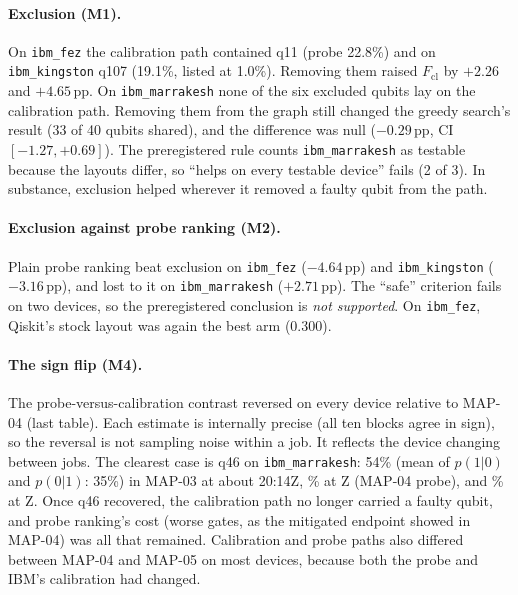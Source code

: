 \documentclass[10pt,twocolumn]{article}
\begin{document}
\paragraph{Exclusion (M1).} On \texttt{ibm\_fez} the calibration path contained q11 (probe 22.8\%) and on
\texttt{ibm\_kingston} q107 (19.1\%, listed at 1.0\%). Removing them raised $F_{\mathrm{cl}}$ by
$+2.26$ and $+4.65$\,pp. On \texttt{ibm\_marrakesh} none of the six excluded qubits lay on the
calibration path. Removing them from the graph still changed the greedy search's result (33 of 40
qubits shared), and the difference was null ($-0.29$\,pp, CI $[-1.27,+0.69]$). The preregistered rule
counts \texttt{ibm\_marrakesh} as testable because the layouts differ, so ``helps on every testable
device'' fails (2 of 3). In substance, exclusion helped wherever it removed a faulty qubit from the path.

\paragraph{Exclusion against probe ranking (M2).} Plain probe ranking beat exclusion on
\texttt{ibm\_fez} ($-4.64$\,pp) and \texttt{ibm\_kingston} ($-3.16$\,pp), and lost to it on
\texttt{ibm\_marrakesh} ($+2.71$\,pp). The ``safe'' criterion fails on two devices, so the
preregistered conclusion is \emph{not supported}. On \texttt{ibm\_fez}, Qiskit's stock layout was again
the best arm (0.300).

\paragraph{The sign flip (M4).} The probe-versus-calibration contrast reversed on every device relative
to MAP-04 (last table). Each estimate is internally precise (all ten blocks agree in sign), so the
reversal is not sampling noise within a job. It reflects the device changing between jobs. The clearest
case is q46 on \texttt{ibm\_marrakesh}: 54\% (mean of $p(1|0)$ and $p(0|1)$: 35\%) in MAP-03 at
about 20:14Z, \QFSixFour\% at \TFour{}Z (MAP-04 probe), and \QFSixFive\% at \TFive{}Z. Once q46 recovered, the calibration path no
longer carried a faulty qubit, and probe ranking's cost (worse gates, as the mitigated endpoint showed in
MAP-04) was all that remained. Calibration and probe paths also differed between MAP-04 and MAP-05 on
most devices, because both the probe and IBM's calibration had changed.
\end{document}
